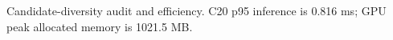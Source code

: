 \begin{table}[t]\centering\scriptsize
\caption{Candidate-diversity audit and efficiency. C20 p95 inference is 0.816 ms; GPU peak allocated memory is 1021.5 MB.}
\resizebox{\linewidth}{!}{}
\end{table}
